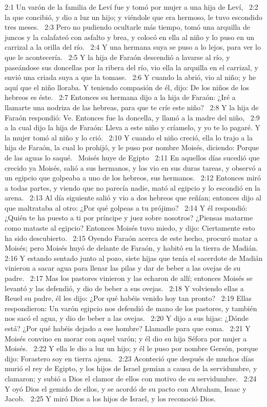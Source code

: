 2:1 Un varón de la familia de Leví fue y tomó por mujer a una hija de Leví,  
2:2 la que concibió, y dio a luz un hijo; y viéndole que era hermoso, le tuvo escondido tres meses.  
2:3 Pero no pudiendo ocultarle más tiempo, tomó una arquilla de juncos y la calafateó con asfalto y brea, y colocó en ella al niño y lo puso en un carrizal a la orilla del río.  
2:4 Y una hermana suya se puso a lo lejos, para ver lo que le acontecería.  
2:5 Y la hija de Faraón descendió a lavarse al río, y paseándose sus doncellas por la ribera del río, vio ella la arquilla en el carrizal, y envió una criada suya a que la tomase.  
2:6 Y cuando la abrió, vio al niño; y he aquí que el niño lloraba. Y teniendo compasión de él, dijo: De los niños de los hebreos es éste.  
2:7 Entonces su hermana dijo a la hija de Faraón: ¿Iré a llamarte una nodriza de las hebreas, para que te críe este niño?  
2:8 Y la hija de Faraón respondió: Ve. Entonces fue la doncella, y llamó a la madre del niño,  
2:9 a la cual dijo la hija de Faraón: Lleva a este niño y críamelo, y yo te lo pagaré. Y la mujer tomó al niño y lo crió.  
2:10 Y cuando el niño creció, ella lo trajo a la hija de Faraón, la cual lo prohijó, y le puso por nombre Moisés, diciendo: Porque de las aguas lo saqué.  
Moisés huye de Egipto  
2:11 En aquellos días sucedió que crecido ya Moisés, salió a sus hermanos, y los vio en sus duras tareas, y observó a un egipcio que golpeaba a uno de los hebreos, sus hermanos.  
2:12 Entonces miró a todas partes, y viendo que no parecía nadie, mató al egipcio y lo escondió en la arena.  
2:13 Al día siguiente salió y vio a dos hebreos que reñían; entonces dijo al que maltrataba al otro: ¿Por qué golpeas a tu prójimo?  
2:14 Y él respondió: ¿Quién te ha puesto a ti por príncipe y juez sobre nosotros? ¿Piensas matarme como mataste al egipcio? Entonces Moisés tuvo miedo, y dijo: Ciertamente esto ha sido descubierto.  
2:15 Oyendo Faraón acerca de este hecho, procuró matar a Moisés; pero Moisés huyó de delante de Faraón, y habitó en la tierra de Madián. 
2:16 Y estando sentado junto al pozo, siete hijas que tenía el sacerdote de Madián vinieron a sacar agua para llenar las pilas y dar de beber a las ovejas de su padre.  
2:17 Mas los pastores vinieron y las echaron de allí; entonces Moisés se levantó y las defendió, y dio de beber a sus ovejas.  
2:18 Y volviendo ellas a Reuel su padre, él les dijo: ¿Por qué habéis venido hoy tan pronto?  
2:19 Ellas respondieron: Un varón egipcio nos defendió de mano de los pastores, y también nos sacó el agua, y dio de beber a las ovejas.  
2:20 Y dijo a sus hijas: ¿Dónde está? ¿Por qué habéis dejado a ese hombre? Llamadle para que coma.  
2:21 Y Moisés convino en morar con aquel varón; y él dio su hija Séfora por mujer a Moisés.  
2:22 Y ella le dio a luz un hijo; y él le puso por nombre Gersón, porque dijo: Forastero soy en tierra ajena.  
2:23 Aconteció que después de muchos días murió el rey de Egipto, y los hijos de Israel gemían a causa de la servidumbre, y clamaron; y subió a Dios el clamor de ellos con motivo de su servidumbre.  
2:24 Y oyó Dios el gemido de ellos, y se acordó de su pacto con Abraham, Isaac y Jacob.  
2:25 Y miró Dios a los hijos de Israel, y los reconoció Dios.  
